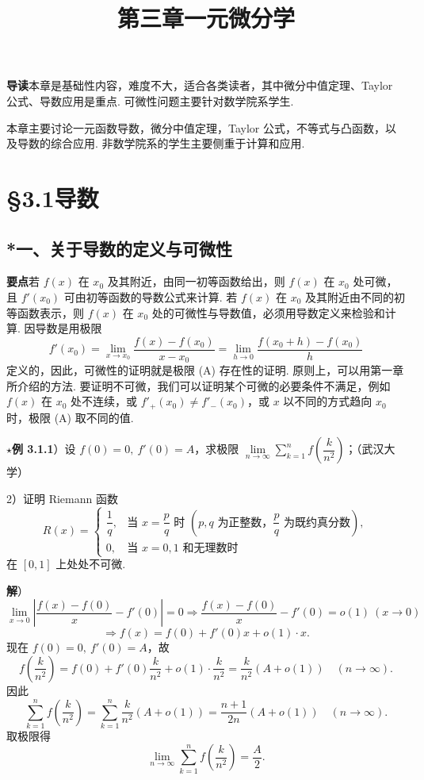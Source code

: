 \documentclass[UTF8, 12pt, fontset=fandol, oneside]{ctexart}
\title{第三章\quad 一元微分学}
\author{}
\date{}
\begin{document}
\maketitle

\noindent\textbf{导读}\quad 本章是基础性内容，难度不大，适合各类读者，其中微分中值定理、Taylor 公式、导数应用是重点. 可微性问题主要针对数学院系学生.

本章主要讨论一元函数导数，微分中值定理，Taylor 公式，不等式与凸函数，以及导数的综合应用. 非数学院系的学生主要侧重于计算和应用.

\section*{§3.1\quad 导数}

\subsection*{*一、关于导数的定义与可微性}

\noindent\textbf{要点}\quad 若 $f(x)$ 在 $x_0$ 及其附近，由同一初等函数给出，则 $f(x)$ 在 $x_0$ 处可微，且 $f'(x_0)$ 可由初等函数的导数公式来计算. 若 $f(x)$ 在 $x_0$ 及其附近由不同的初等函数表示，则 $f(x)$ 在 $x_0$ 处的可微性与导数值，必须用导数定义来检验和计算. 因导数是用极限
\begin{equation}
  f'(x_0)=\lim_{x\to x_0}\frac{f(x)-f(x_0)}{x-x_0}
  =\lim_{h\to0}\frac{f(x_0+h)-f(x_0)}h
\tag{A}
\end{equation}
定义的，因此，可微性的证明就是极限 (A) 存在性的证明. 原则上，可以用第一章所介绍的方法. 要证明不可微，我们可以证明某个可微的必要条件不满足，例如 $f(x)$ 在 $x_0$ 处不连续，或 $f'_+(x_0)\ne f'_-(x_0)$，或 $x$ 以不同的方式趋向 $x_0$ 时，极限 (A) 取不同的值.

\noindent\textbf{$\star$例 3.1.1}）设 $f(0)=0,\ f'(0)=A$，求极限 $\lim\limits_{n\to\infty}\sum\limits_{k=1}^n f\left(\dfrac{k}{n^2}\right)$；（武汉大学）

2）证明 Riemann 函数
\[
R(x)=
\begin{cases}
\dfrac1q, & \text{当 }x=\dfrac pq\text{ 时 }(p,q\text{ 为正整数，}\dfrac pq\text{ 为既约真分数}),\\
0, & \text{当 }x=0,1\text{ 和无理数时}
\end{cases}
\]
在 $[0,1]$ 上处处不可微.

\noindent\textbf{解}）$\lim\limits_{x\to0}\left|\dfrac{f(x)-f(0)}x-f'(0)\right|=0\Rightarrow\dfrac{f(x)-f(0)}x-f'(0)=o(1)\ (x\to0)$
\[
  \Rightarrow f(x)=f(0)+f'(0)x+o(1)\cdot x.
\]
现在 $f(0)=0,\ f'(0)=A$，故
\[
  f\left(\frac{k}{n^2}\right)=f(0)+f'(0)\frac{k}{n^2}+o(1)\cdot\frac{k}{n^2}
  =\frac{k}{n^2}(A+o(1))\quad(n\to\infty).
\]
因此
\[
\sum_{k=1}^n f\left(\frac{k}{n^2}\right)
=\sum_{k=1}^n\frac{k}{n^2}(A+o(1))
=\frac{n+1}{2n}(A+o(1))\quad(n\to\infty).
\]
取极限得
\[
  \lim_{n\to\infty}\sum_{k=1}^n f\left(\frac{k}{n^2}\right)=\frac A2.
\]
\end{document}
